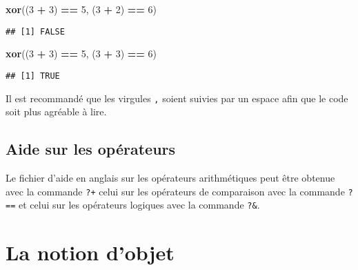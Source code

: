 \documentclass[]{book}
\newenvironment{Shaded}{\begin{snugshade}}{\end{snugshade}}
\newcommand{\KeywordTok}[1]{\textcolor[rgb]{0.13,0.29,0.53}{\textbf{#1}}}
\newcommand{\DecValTok}[1]{\textcolor[rgb]{0.00,0.00,0.81}{#1}}
\newcommand{\StringTok}[1]{\textcolor[rgb]{0.31,0.60,0.02}{#1}}
\newcommand{\OperatorTok}[1]{\textcolor[rgb]{0.81,0.36,0.00}{\textbf{#1}}}
\newcommand{\NormalTok}[1]{#1}
\theoremstyle{definition}
\theoremstyle{definition}
\theoremstyle{definition}
\theoremstyle{remark}
\begin{document}
\begin{Shaded}
\begin{Highlighting}[]
\KeywordTok{xor}\NormalTok{((}\DecValTok{3} \OperatorTok{+}\StringTok{ }\DecValTok{3}\NormalTok{) }\OperatorTok{==}\StringTok{ }\DecValTok{5}\NormalTok{, (}\DecValTok{3} \OperatorTok{+}\StringTok{ }\DecValTok{2}\NormalTok{) }\OperatorTok{==}\StringTok{ }\DecValTok{6}\NormalTok{)}
\end{Highlighting}
\end{Shaded}

\begin{verbatim}
## [1] FALSE
\end{verbatim}

\begin{Shaded}
\begin{Highlighting}[]
\KeywordTok{xor}\NormalTok{((}\DecValTok{3} \OperatorTok{+}\StringTok{ }\DecValTok{3}\NormalTok{) }\OperatorTok{==}\StringTok{ }\DecValTok{5}\NormalTok{, (}\DecValTok{3} \OperatorTok{+}\StringTok{ }\DecValTok{3}\NormalTok{) }\OperatorTok{==}\StringTok{ }\DecValTok{6}\NormalTok{)}
\end{Highlighting}
\end{Shaded}

\begin{verbatim}
## [1] TRUE
\end{verbatim}

Il est recommandé que les virgules \texttt{,} soient suivies par un
espace afin que le code soit plus agréable à lire.

\subsection{Aide sur les opérateurs}\label{aide-sur-les-operateurs}

Le fichier d'aide en anglais sur les opérateurs arithmétiques peut être
obtenue avec la commande \texttt{?\textquotesingle{}+\textquotesingle{}}
celui sur les opérateurs de comparaison avec la commande
\texttt{?\textquotesingle{}==\textquotesingle{}} et celui sur les
opérateurs logiques avec la commande
\texttt{?\textquotesingle{}\&\textquotesingle{}}.

\hypertarget{l011object}{\section{La notion d'objet}\label{l011object}}
\end{document}
